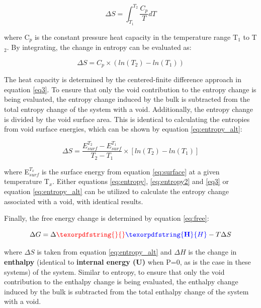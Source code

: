 \documentclass[review]{elsarticle}
\providecommand{\DIFaddtex}[1]{{\bf #1}} %
\providecommand{\DIFdeltex}[1]{} %
\providecommand{\DIFaddbegin}{\protect\color{blue}} %
\providecommand{\DIFaddend}{\protect\color{black}} %
\providecommand{\DIFdelbegin}{\protect\color{red}} %
\providecommand{\DIFdelend}{\protect\color{black}} %
\providecommand{\DIFadd}[1]{\texorpdfstring{\DIFaddtex{#1}}{#1}} %
\providecommand{\DIFdel}[1]{\texorpdfstring{\DIFdeltex{#1}}{}} %
\newcommand{\DIFscaledelfig}{0.5}
\newlength{\DIFdelgraphicswidth} %
\newlength{\DIFdelgraphicsheight} %
\newcommand{\DIFaddincludegraphics}[2][]{{\color{blue}\fbox{\DIFOincludegraphics[#1]{#2}}}} %
\newcommand{\DIFdelincludegraphics}[2][]{%
\sbox{\DIFdelgraphicsbox}{\DIFOincludegraphics[#1]{#2}}%
\settoboxwidth{\DIFdelgraphicswidth}{\DIFdelgraphicsbox} %
\settoboxtotalheight{\DIFdelgraphicsheight}{\DIFdelgraphicsbox} %
\scalebox{\DIFscaledelfig}{%
\parbox[b]{\DIFdelgraphicswidth}{\usebox{\DIFdelgraphicsbox}\\[-\baselineskip] \rule{\DIFdelgraphicswidth}{0em}}\llap{\resizebox{\DIFdelgraphicswidth}{\DIFdelgraphicsheight}{%
\setlength{\unitlength}{\DIFdelgraphicswidth}%
\begin{picture}(1,1)%
\thicklines\linethickness{2pt} %
{\color[rgb]{1,0,0}\put(0,0){\framebox(1,1){}}}%
{\color[rgb]{1,0,0}\put(0,0){\line( 1,1){1}}}%
{\color[rgb]{1,0,0}\put(0,1){\line(1,-1){1}}}%
\end{picture}%
}\hspace*{3pt}}} %
} %
\DeclareRobustCommand{\DIFaddbegin}{\DIFOaddbegin \let\includegraphics\DIFaddincludegraphics} %
\DeclareRobustCommand{\DIFaddend}{\DIFOaddend \let\includegraphics\DIFOincludegraphics} %
\DeclareRobustCommand{\DIFdelbegin}{\DIFOdelbegin \let\includegraphics\DIFdelincludegraphics} %
\DeclareRobustCommand{\DIFdelend}{\DIFOaddend \let\includegraphics\DIFOincludegraphics} %
\begin{document}
\begin{equation}
\label{eq:entropy}
\Delta S = \int_{T_{1}}^{T_{2}} \frac{C_{p}}{T} dT
\end{equation}

where C$_{p}$ is the constant pressure heat capacity in the temperature range T$_{1}$ to T$_{2}$. By integrating, the change in entropy can be evaluated as:

\begin{equation}
\label{eq:entropy2}
\Delta S = C_{p} \times (ln(T_{2}) - ln(T_{1})) 
\end{equation}

The heat capacity is determined by the centered-finite difference approach in equation \ref{eq3}. To ensure that only the void contribution to the entropy change is being evaluated, the entropy change induced by the bulk is subtracted from the total entropy change of the system with a void. Additionally, the entropy change is divided by the void surface area. This is identical to calculating the entropies from void surface energies, which can be shown by equation \ref{eq:entropy_alt}:

\begin{equation}
\label{eq:entropy_alt}
\Delta S =\frac{ E_{surf}^{T_2} - E_{surf}^{T_1}}{T_2 - T_1} \times [ ln(T_2) - ln(T_1) ]
\end{equation}

where E$_{surf}^{T_{x}}$ is the surface energy from equation \ref{eq:surface} at a given temperature T$_x$. Either equations \ref{eq:entropy}, \ref{eq:entropy2} and \ref{eq3} or equation \ref{eq:entropy_alt} can be utilized to calculate the entropy change associated with a void, with identical results. 

Finally, the free energy change is determined by equation \ref{eq:free}:

\begin{equation}
\label{eq:free}
\Delta G = \Delta \DIFdelbegin \DIFdel{U }\DIFdelend \DIFaddbegin \DIFadd{H }\DIFaddend - T \Delta S
\end{equation}

where $\Delta S$ is taken from equation \ref{eq:entropy_alt} and \DIFdelbegin \DIFdel{$\Delta U$ }\DIFdelend \DIFaddbegin \DIFadd{$\Delta H$ }\DIFaddend is the change in \DIFdelbegin \DIFdel{internal energy }\DIFdelend \DIFaddbegin \DIFadd{enthalpy }\DIFaddend (identical to \DIFdelbegin \DIFdel{enthalpy }\DIFdelend \DIFaddbegin \DIFadd{internal energy (U) }\DIFaddend when P=0, as is the case in these systems) of the system. Similar to entropy, to ensure that only the void contribution to the enthalpy change is being evaluated, the enthalpy change induced by the bulk is subtracted from the total enthalpy change of the system with a void.
\end{document}
